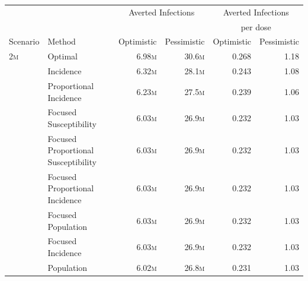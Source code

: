 
\begin{fwtable}
\centering
\small
\begin{tabular}{llrrrr}
\toprule
& {} & \multicolumn{2}{c}{Averted Infections} & \multicolumn{2}{c}{Averted Infections} \\
&    &  & & \multicolumn{2}{c}{per dose} \\
Scenario & Method &  Optimistic & Pessimistic &     Optimistic & Pessimistic          \\
\midrule
2\textsc{m} & Optimal &   6.98\textsc{m} &    30.6\textsc{m} &          0.268 &        1.18 \\
        & Incidence &   6.32\textsc{m} &    28.1\textsc{m} &          0.243 &        1.08 \\
        & Proportional Incidence &   6.23\textsc{m} &    27.5\textsc{m} &          0.239 &        1.06 \\
        & Focused Susceptibility &   6.03\textsc{m} &    26.9\textsc{m} &          0.232 &        1.03 \\
        & Focused Proportional Susceptibility &   6.03\textsc{m} &    26.9\textsc{m} &          0.232 &        1.03 \\
        & Focused Proportional Incidence &   6.03\textsc{m} &    26.9\textsc{m} &          0.232 &        1.03 \\
        & Focused Population &   6.03\textsc{m} &    26.9\textsc{m} &          0.232 &        1.03 \\
        & Focused Incidence &   6.03\textsc{m} &    26.9\textsc{m} &          0.232 &        1.03 \\
        & Population &   6.02\textsc{m} &    26.8\textsc{m} &          0.231 &        1.03 \\

\end{tabular}
\end{fwtable}
